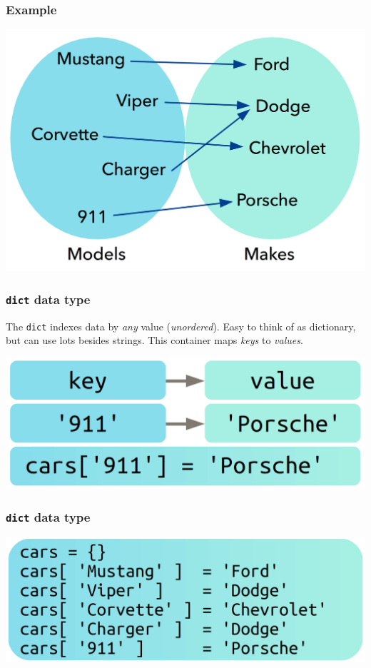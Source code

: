 \documentclass[11pt]{beamer}
\begin{document}
\begin{frame}[fragile]
  \frametitle{Example}

  \includegraphics[height=0.75\textheight]{./img/dict-01.png}
\end{frame}

\begin{frame}[fragile]
  \frametitle{\texttt{dict} data type}
  \Enlarge

  \begin{itemize}
  \myitem  The \texttt{dict} indexes data by \emph{any} value (\emph{unordered}).
  \myitem  Easy to think of as dictionary, but can use lots besides strings.
  \myitem  This container maps \emph{keys} to \emph{values}.
  \end{itemize}
  \includegraphics[height=0.333\textheight]{./img/dict-02.png}
\end{frame}

\begin{frame}[fragile]
  \frametitle{\texttt{dict} data type}
  \Enlarge

  \includegraphics[width=\textwidth]{./img/dict-03.png}
\end{frame}
\end{document}
